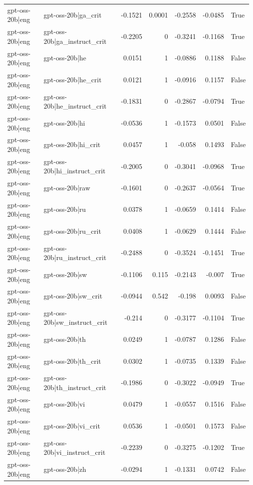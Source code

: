 \begin{table}
\begin{tabular}{l l r r r r l}
gpt-oss-20b|eng & gpt-oss-20b|ga_crit & -0.1521 & 0.0001 & -0.2558 & -0.0485 & True \\
gpt-oss-20b|eng & gpt-oss-20b|ga_instruct_crit & -0.2205 & 0 & -0.3241 & -0.1168 & True \\
gpt-oss-20b|eng & gpt-oss-20b|he & 0.0151 & 1 & -0.0886 & 0.1188 & False \\
gpt-oss-20b|eng & gpt-oss-20b|he_crit & 0.0121 & 1 & -0.0916 & 0.1157 & False \\
gpt-oss-20b|eng & gpt-oss-20b|he_instruct_crit & -0.1831 & 0 & -0.2867 & -0.0794 & True \\
gpt-oss-20b|eng & gpt-oss-20b|hi & -0.0536 & 1 & -0.1573 & 0.0501 & False \\
gpt-oss-20b|eng & gpt-oss-20b|hi_crit & 0.0457 & 1 & -0.058 & 0.1493 & False \\
gpt-oss-20b|eng & gpt-oss-20b|hi_instruct_crit & -0.2005 & 0 & -0.3041 & -0.0968 & True \\
gpt-oss-20b|eng & gpt-oss-20b|raw & -0.1601 & 0 & -0.2637 & -0.0564 & True \\
gpt-oss-20b|eng & gpt-oss-20b|ru & 0.0378 & 1 & -0.0659 & 0.1414 & False \\
gpt-oss-20b|eng & gpt-oss-20b|ru_crit & 0.0408 & 1 & -0.0629 & 0.1444 & False \\
gpt-oss-20b|eng & gpt-oss-20b|ru_instruct_crit & -0.2488 & 0 & -0.3524 & -0.1451 & True \\
gpt-oss-20b|eng & gpt-oss-20b|sw & -0.1106 & 0.115 & -0.2143 & -0.007 & True \\
gpt-oss-20b|eng & gpt-oss-20b|sw_crit & -0.0944 & 0.542 & -0.198 & 0.0093 & False \\
gpt-oss-20b|eng & gpt-oss-20b|sw_instruct_crit & -0.214 & 0 & -0.3177 & -0.1104 & True \\
gpt-oss-20b|eng & gpt-oss-20b|th & 0.0249 & 1 & -0.0787 & 0.1286 & False \\
gpt-oss-20b|eng & gpt-oss-20b|th_crit & 0.0302 & 1 & -0.0735 & 0.1339 & False \\
gpt-oss-20b|eng & gpt-oss-20b|th_instruct_crit & -0.1986 & 0 & -0.3022 & -0.0949 & True \\
gpt-oss-20b|eng & gpt-oss-20b|vi & 0.0479 & 1 & -0.0557 & 0.1516 & False \\
gpt-oss-20b|eng & gpt-oss-20b|vi_crit & 0.0536 & 1 & -0.0501 & 0.1573 & False \\
gpt-oss-20b|eng & gpt-oss-20b|vi_instruct_crit & -0.2239 & 0 & -0.3275 & -0.1202 & True \\
gpt-oss-20b|eng & gpt-oss-20b|zh & -0.0294 & 1 & -0.1331 & 0.0742 & False \\

\end{tabular}
\end{table}
